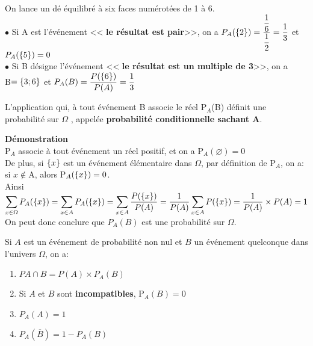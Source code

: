 \begin{example}
On lance un dé équilibré à six faces numérotées de 1 à 6.\\
 $ \bullet $ Si A est l'événement  << \textbf{le résultat est pair}>>,  on a\;  $ P _{A}(\left\{2\right\})=\dfrac{\dfrac{1}{6}}{\dfrac{1}{2}} =\dfrac{1}{3}$\; et \;$P _{A}(\left\{5\right\})=0  $ \\

 $ \bullet $ Si B désigne  l'événement  << \textbf{le résultat est un multiple de 3}>>,  on a\\

 B$ =\left\{3; 6\right\} $\; et \;  $ P _{A}(B)=\dfrac{P(\left\{6\right\})}{P(A)} =\dfrac{1}{3}$
\end{example}
\begin{theorem}
L'application  qui, à tout événement B associe le réel P$ _{A} $(B) définit une probabilité sur $ \Omega $ , appelée \textbf{probabilité conditionnelle sachant  A}.

\end{theorem}



\textbf{Démonstration}\\
P$ _{A} $ associe à tout événement un réel positif, et on a P$ _{A}(\varnothing)=0 $\\
De plus, si $ \left\{x\right\} $   est un événement élémentaire dans $ \Omega $, par définition de P$ _{A} $, on a: si $x \notin $A, alors P$ _{A}(\left\{x\right\})=0 $.\\

Ainsi $ \displaystyle\sum_{x\in \Omega} P _{A}(\left\{x\right\}) = \displaystyle\sum_{x\in A} P _{A}(\left\{x\right\})=\displaystyle\sum_{x\in A} \dfrac{P(\left\{x\right\})}{P(A)}=\dfrac{1}{P(A)}\displaystyle\sum_{x\in A}P(\left\{x\right\})=\dfrac{1}{P(A)}\times P(A)=1$\\
 On peut donc conclure que  $P_{A}(B)$ est une probabilité sur $ \Omega $.
 
 \begin{property}
 Si $A$ est un événement de probabilité non nul et $B$ un événement quelconque dans l'univers $ \Omega $, on a:

\begin{enumerate}
\item $ PA\cap B=P(A)\times P_{A}(B)$
\item Si $A$ et $B$ sont \textbf{incompatibles}, P$_{A}(B) =0 $
\item $P_{A}(A) =1 $
\item  $P_{A}(\overline{B}) =1- P_{A}(B)$
\end{enumerate}
 \end{property}
 
